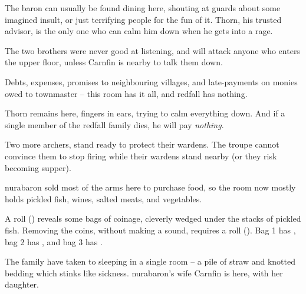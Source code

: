 \begin{multicols}{2}
The baron can usually be found dining here, shouting at guards about some imagined insult, or just terrifying people for the fun of it.
Thorn, his trusted advisor, is the only one who can calm him down when he gets into a rage.


The two brothers were never good at listening, and will attack anyone who enters the upper floor, unless Carnfin is nearby to talk them down.



Debts, expenses, promises to neighbouring \glspl{village}, and late-payments on monies owed to \gls{townmaster} -- this room has it all, and \gls{redfall} has nothing.

Thorn remains here, fingers in ears, trying to calm everything down.
And if a single member of the \gls{redfall} family dies, he will pay \emph{nothing}.

\thornSeneschal


Two more archers, stand ready to protect their \glspl{warden}.
The troupe cannot convince them to stop firing while their \glspl{warden} stand nearby (or they risk becoming supper).



\Gls{nurabaron} sold most of the arms here to purchase food, so the room now mostly holds pickled fish, wines, salted meats, and vegetables.

A  roll (\tn[10]) reveals some bags of coinage, cleverly wedged under the stacks of pickled fish.
Removing the coins, without making a sound, requires a  roll (\tn[12]).
Bag 1 has \lootMedium, bag 2 has \lootMedium, and bag 3 has \lootBig.


The family have taken to sleeping in a single room -- a pile of straw and knotted bedding which stinks like sickness.
\Gls{nurabaron}'s wife Carnfin is here, with her daughter.


\end{multicols}
